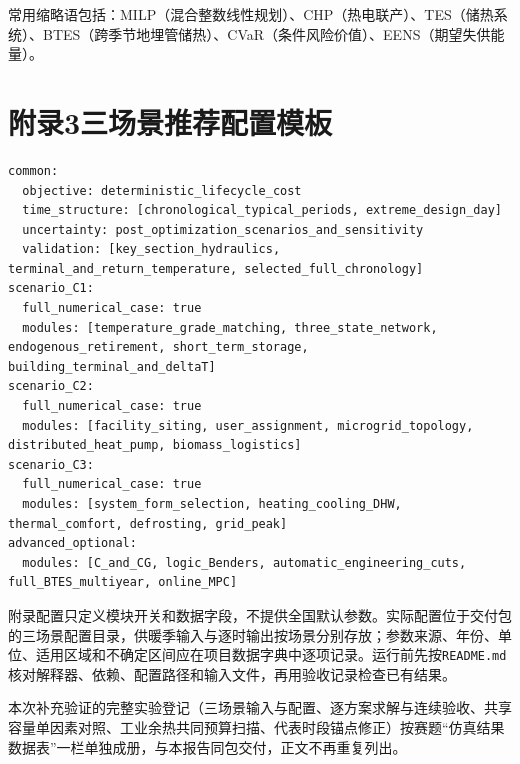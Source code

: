 \documentclass[12pt,a4paper]{article}
\begin{document}
常用缩略语包括：MILP（混合整数线性规划）、CHP（热电联产）、TES（储热系统）、BTES（跨季节地埋管储热）、CVaR（条件风险价值）、EENS（期望失供能量）。

\clearpage
\section*{附录3\quad 三场景推荐配置模板}\label{ux9644ux5f55-a-ux4e09ux573aux666fux63a8ux8350ux914dux7f6eux6a21ux677f}

\begin{Verbatim}[breaklines=true,breakanywhere=true,fontsize=\small]
common:
  objective: deterministic_lifecycle_cost
  time_structure: [chronological_typical_periods, extreme_design_day]
  uncertainty: post_optimization_scenarios_and_sensitivity
  validation: [key_section_hydraulics, terminal_and_return_temperature, selected_full_chronology]
scenario_C1:
  full_numerical_case: true
  modules: [temperature_grade_matching, three_state_network, endogenous_retirement, short_term_storage, building_terminal_and_deltaT]
scenario_C2:
  full_numerical_case: true
  modules: [facility_siting, user_assignment, microgrid_topology, distributed_heat_pump, biomass_logistics]
scenario_C3:
  full_numerical_case: true
  modules: [system_form_selection, heating_cooling_DHW, thermal_comfort, defrosting, grid_peak]
advanced_optional:
  modules: [C_and_CG, logic_Benders, automatic_engineering_cuts, full_BTES_multiyear, online_MPC]
\end{Verbatim}

附录配置只定义模块开关和数据字段，不提供全国默认参数。实际配置位于交付包的三场景配置目录，供暖季输入与逐时输出按场景分别存放；参数来源、年份、单位、适用区域和不确定区间应在项目数据字典中逐项记录。运行前先按\texttt{README.md}核对解释器、依赖、配置路径和输入文件，再用验收记录检查已有结果。

本次补充验证的完整实验登记（三场景输入与配置、逐方案求解与连续验收、共享容量单因素对照、工业余热共同预算扫描、代表时段锚点修正）按赛题“仿真结果数据表”一栏单独成册，与本报告同包交付，正文不再重复列出。
\end{document}
